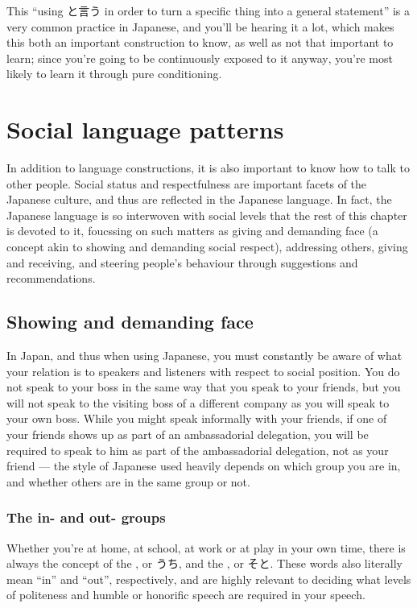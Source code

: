 \documentclass[11pt, b5paper, twoside, openright, onecolumn]{book}
\begin{document}
This “using と言う in order to turn a specific thing into a general statement” is a very common practice in Japanese‚ and you’ll be hearing it a lot‚ which makes this both an important construction to know‚ as well as not that important to learn; since you’re going to be continuously exposed to it anyway‚ you’re most likely to learn it through pure conditioning.

\section{Social language patterns}

In addition to language constructions‚ it is also important to know how to talk to other people. Social status and respectfulness are important facets of the Japanese culture‚ and thus are reflected in the Japanese language. In fact‚ the Japanese language is so interwoven with social levels that the rest of this chapter is devoted to it‚ foucssing on such matters as giving and demanding face (a concept akin to showing and demanding social respect)‚ addressing others‚ giving and receiving‚ and steering people’s behaviour through suggestions and recommendations.

\subsection{Showing and demanding face}

In Japan‚ and thus when using Japanese‚ you must constantly be aware of what your relation is to speakers and listeners with respect to social position. You do not speak to your boss in the same way that you speak to your friends‚ but you will not speak to the visiting boss of a different company as you will speak to your own boss. While you might speak informally with your friends‚ if one of your friends shows up as part of an ambassadorial delegation‚ you will be required to speak to him as part of the ambassadorial delegation‚ not as your friend — the style of Japanese used heavily depends on which group you are in‚ and whether others are in the same group or not.

\subsubsection{The in- and out- groups}

Whether you’re at home‚ at school‚ at work or at play in your own time‚ there is always the concept of the ‚ or うち‚  and the ‚ or そと. These words also literally mean “in” and “out”‚ respectively‚ and are highly relevant to deciding what levels of politeness and humble or honorific speech are required in your speech.
\end{document}
